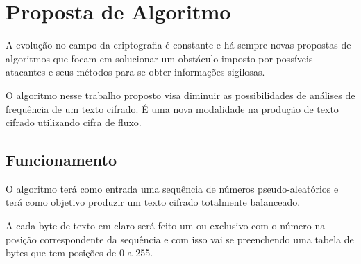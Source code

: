 \chapter{Proposta de Algoritmo}
\label{algorithm-proposition}

A evolução no campo da criptografia é constante e há sempre novas propostas de algoritmos que focam em solucionar um obstáculo imposto por possíveis atacantes e seus métodos para se obter informações sigilosas.

O algoritmo nesse trabalho proposto visa diminuir as possibilidades de análises de frequência de um texto cifrado. É uma nova modalidade na produção de texto cifrado utilizando cifra de fluxo. 

\section{Funcionamento}
\label{functioning}

O algoritmo terá como entrada uma sequência de números pseudo-aleatórios e terá como objetivo produzir um texto cifrado totalmente balanceado.

A cada byte de texto em claro será feito um ou-exclusivo com o número na posição correspondente da sequência e com isso vai se preenchendo uma tabela de bytes que tem posições de 0 a 255.

